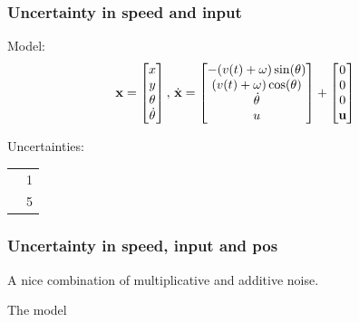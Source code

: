 \subsubsection{Uncertainty in speed and input}
Model:
\begin{equation}
  \label{eq:model-dynamics}
  \mathbf{x} =
  \begin{bmatrix}
    x \\ y \\ \theta \\ \dot{\theta} \\
  \end{bmatrix}, \, \dot{\mathbf{x}} =
  \begin{bmatrix}
    -(v(t) + \mathbf{\omega}{}) \sin(\theta) \\
    (v(t) + \mathbf{\omega}{}) \cos(\theta) \\
    \dot{\theta} \\
    u \\
  \end{bmatrix}
  +
  \begin{bmatrix}
    0 \\
    0 \\
    0 \\
    {\mathbf{u}}{} \\
  \end{bmatrix}
\end{equation}

Uncertainties:
\begin{tabular}{|c|c|}
  \hline
  \randomSpeedVar{} & 1 \\
  \randomInputVar{} & 5 \\
  \hline
\end{tabular}

\subsubsection{Uncertainty in speed, input and pos}

A nice combination of multiplicative and additive noise.

The model

